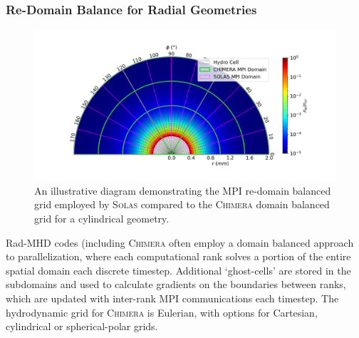 \subsubsection{Re-Domain Balance for Radial Geometries}

\begin{figure}[t!]
    \includegraphics[width=\linewidth]{Numerics/Images/SOLAS_CHIMERA_domain.png}
    \centering
    \caption{An illustrative diagram demonstrating the MPI re-domain balanced grid employed by \textsc{Solas} compared to the \textsc{Chimera} domain balanced grid for a cylindrical geometry.}%
    \label{fig:SOLAS_CHIMERA_domain}
\end{figure}

\ac{Rad-MHD} codes (including \textsc{Chimera} often employ a domain balanced approach to parallelization, where each computational rank solves a portion of the entire spatial domain each discrete timestep.
Additional `ghost-cells' are stored in the subdomains and used to calculate gradients on the boundaries between ranks, which are updated with inter-rank \ac{MPI} communications each timestep.
The hydrodynamic grid for \textsc{Chimera} is Eulerian, with options for Cartesian, cylindrical or spherical-polar grids.

